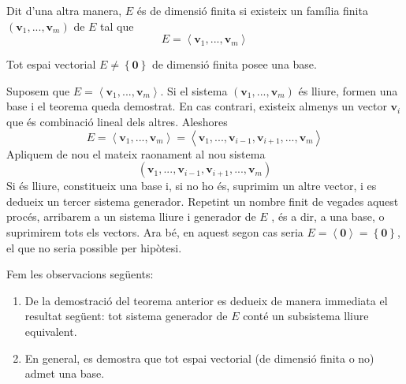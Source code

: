 \begin{observacio}
Dit d'una altra manera, $E$ és de dimensió finita si existeix un
família finita $\left( \mathbf{v}_{1},...,\mathbf{v}_{m}\right) $ de $%
E$ tal que%
\begin{equation*}
E=\left\langle \mathbf{v}_{1},...,\mathbf{v}_{m}\right\rangle
\end{equation*}
\end{observacio}

\begin{teorema}
Tot espai vectorial $E\neq \left\{ \mathbf{0}\right\} $ de
dimensió finita posee una base.

\end{teorema}
\begin{prova}
Suposem que $E=\left\langle \mathbf{v}_{1},...,\mathbf{v}%
_{m}\right\rangle $. Si el sistema $\left( \mathbf{v}_{1},...,\mathbf{v}%
_{m}\right) $ és lliure, formen una base i el teorema queda demostrat. En
cas contrari, existeix almenys un vector $\mathbf{v}_{i}$ que és combinació lineal dels altres. Aleshores%
\begin{equation*}
E=\left\langle \mathbf{v}_{1},...,\mathbf{v}_{m}\right\rangle
=\left\langle \mathbf{v}_{1},...,\mathbf{v}_{i-1},\mathbf{v}_{i+1},...,%
\mathbf{v}_{m}\right\rangle
\end{equation*}%
Apliquem de nou el mateix raonament al nou sistema 
\begin{equation*}
\left( \mathbf{v}_{1},...,\mathbf{v}_{i-1},\mathbf{v}_{i+1},...,\mathbf{v}%
_{m}\right)
\end{equation*}%
Si és lliure, constitueix una base i, si no ho és, suprimim un altre vector,
i es dedueix un tercer sistema generador. Repetint un nombre finit de
vegades aquest procés, arribarem a un sistema lliure i generador de $E$%
, és a dir, a una base, o suprimirem tots els vectors. Ara bé, en
aquest segon cas seria $E=\left\langle \mathbf{0}%
\right\rangle =\left\{ \mathbf{0}\right\} $, el que no seria possible
per hipòtesi.
\end{prova}

\begin{observacio}
Fem les observacions següents:

\begin{enumerate}
\item De la demostració del teorema anterior es dedueix de manera
immediata el resultat següent: tot sistema generador de $E$
conté un subsistema lliure equivalent.

\item En general, es demostra que tot espai vectorial (de dimensió
finita o no) admet una base.
\end{enumerate}
\end{observacio}

